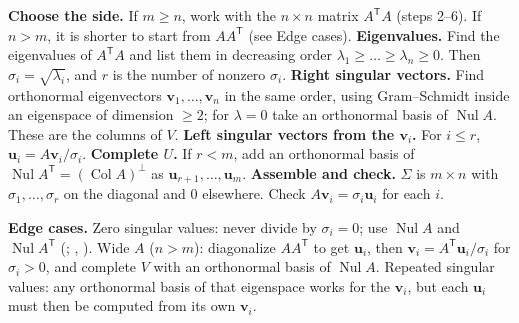 \documentclass[10pt]{scrartcl}
\newcommand{\vv}[1]{\mathbf{#1}}
\DeclareMathOperator{\Nul}{Nul}
\DeclareMathOperator{\Col}{Col}
\newenvironment{howto}[1]{\begin{mdframed}[style=howtostyle,frametitle={#1}]}{\end{mdframed}}
\begin{document}
\begin{howto}{How to find a singular value decomposition $A=U\Sigma V^{\mathsf T}$}
  \begin{steps}
    \ii \textbf{Choose the side.} If $m\ge n$, work with the $n\times n$ matrix $A^{\mathsf T}A$ (steps 2--6). If $n>m$, it is shorter to start from $AA^{\mathsf T}$ (see Edge cases).
    \ii \textbf{Eigenvalues.} Find the eigenvalues of $A^{\mathsf T}A$ and list them in decreasing order $\lambda_1\ge\dots\ge\lambda_n\ge 0$. Then $\sigma_i=\sqrt{\lambda_i}$, and $r$ is the number of nonzero $\sigma_i$.
    \ii \textbf{Right singular vectors.} Find orthonormal eigenvectors $\vv v_1,\dots,\vv v_n$ in the same order, using Gram--Schmidt inside an eigenspace of dimension $\ge 2$; for $\lambda=0$ take an orthonormal basis of $\Nul A$. These are the columns of $V$.
    \ii \textbf{Left singular vectors from the $\vv v_i$.} For $i\le r$, $\vv u_i=A\vv v_i/\sigma_i$.
    \ii \textbf{Complete $U$.} If $r<m$, add an orthonormal basis of $\Nul A^{\mathsf T}=(\Col A)^\perp$ as $\vv u_{r+1},\dots,\vv u_m$.
    \ii \textbf{Assemble and check.} $\Sigma$ is $m\times n$ with $\sigma_1,\dots,\sigma_r$ on the diagonal and $0$ elsewhere. Check $A\vv v_i=\sigma_i\vv u_i$ for each $i$.
  \end{steps}
  \textbf{Edge cases.} Zero singular values: never divide by $\sigma_i=0$; use $\Nul A$ and $\Nul A^{\mathsf T}$ (; , ). Wide $A$ ($n>m$): diagonalize $AA^{\mathsf T}$ to get $\vv u_i$, then $\vv v_i=A^{\mathsf T}\vv u_i/\sigma_i$ for $\sigma_i>0$, and complete $V$ with an orthonormal basis of $\Nul A$. Repeated singular values: any orthonormal basis of that eigenspace works for the $\vv v_i$, but each $\vv u_i$ must then be computed from its own $\vv v_i$.
\end{howto}
\end{document}
